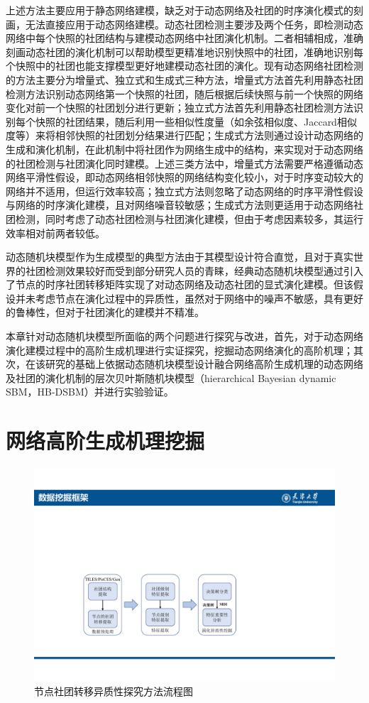 上述方法主要应用于静态网络建模，缺乏对于动态网络及社团的时序演化模式的刻画，无法直接应用于动态网络建模。动态社团检测主要涉及两个任务，即检测动态网络中每个快照的社团结构与建模动态网络中社团演化机制。二者相辅相成，准确刻画动态社团的演化机制可以帮助模型更精准地识别快照中的社团，准确地识别每个快照中的社团也能支撑模型更好地建模动态社团的演化。现有动态网络社团检测的方法主要分为增量式、独立式和生成式三种方法，增量式方法首先利用静态社团检测方法识别动态网络第一个快照的社团，随后根据后续快照与前一个快照的网络变化对前一个快照的社团划分进行更新；独立式方法首先利用静态社团检测方法识别每个快照的社团结果，随后利用一些相似性度量（如余弦相似度、Jaccard相似度等）来将相邻快照的社团划分结果进行匹配；生成式方法则通过设计动态网络的生成和演化机制，在此机制中将社团作为网络生成中的结构，来实现对于动态网络的社团检测与社团演化同时建模。上述三类方法中，增量式方法需要严格遵循动态网络平滑性假设，即动态网络相邻快照的网络结构变化较小，对于时序变动较大的网络并不适用，但运行效率较高；独立式方法则忽略了动态网络的时序平滑性假设与网络的时序演化建模，且对网络噪音较敏感；生成式方法则更适用于动态网络社团检测，同时考虑了动态社团检测与社团演化建模，但由于考虑因素较多，其运行效率相对前两者较低。

动态随机块模型\cite{yang2011detecting}作为生成模型的典型方法由于其模型设计符合直觉，且对于真实世界的社团检测效果较好而受到部分研究人员的青睐，经典动态随机块模型通过引入了节点的时序社团转移矩阵实现了对动态网络及动态社团的显式演化建模。但该假设并未考虑节点在演化过程中的异质性，虽然对于网络中的噪声不敏感，具有更好的鲁棒性，但对于社团演化的建模并不精准。

本章针对动态随机块模型所面临的两个问题进行探究与改进，首先，对于动态网络演化建模过程中的高阶生成机理进行实证探究，挖掘动态网络演化的高阶机理；其次，在该研究的基础上依据动态随机块模型设计融合网络高阶生成机理的动态网络及社团的演化机制的层次贝叶斯随机块模型（hierarchical Bayesian dynamic SBM，HB-DSBM）并进行实验验证。

\section{网络高阶生成机理挖掘}


\begin{figure}[!htbp]
	\setlength{\abovecaptionskip}{0pt} 
	\setlength{\belowcaptionskip}{10pt} 
        \centering
	\includegraphics[width=.7\textwidth]{figures/chap03/figure/modelChap3.pdf}
	\caption{节点社团转移异质性探究方法流程图}
	\label{fig.3.1}
\end{figure}

